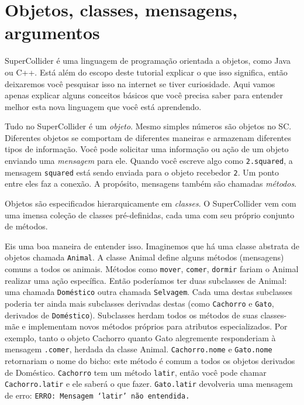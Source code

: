 \section{Objetos, classes, mensagens, argumentos}

SuperCollider é uma linguagem de programação orientada a objetos, como Java ou C++. Está além do escopo deste tutorial explicar o que isso significa, então deixaremos você pesquisar isso na internet se tiver curiosidade. Aqui vamos apenas explicar alguns conceitos básicos que você precisa saber para entender melhor esta nova linguagem que você está aprendendo.

Tudo no SuperCollider é um \emph{objeto}. Mesmo simples números são objetos no SC. Diferentes objetos se comportam de diferentes maneiras e armazenam diferentes tipos de informação. Você pode solicitar uma informação ou ação de um objeto enviando uma \emph{mensagem} para ele. Quando você escreve algo como \texttt{2.squared}, a mensagem \texttt{squared} está sendo enviada para o objeto recebedor \texttt{2}. Um ponto entre eles faz a conexão. A propósito, mensagens também são chamadas \emph{métodos}.

Objetos são especificados hierarquicamente em \emph{classes}. O SuperCollider vem com uma imensa coleção de classes pré-definidas, cada uma com seu próprio conjunto de métodos. 

Eis uma boa maneira de entender isso. Imaginemos que há uma classe abstrata de objetos chamada \texttt{Animal}. A classe Animal define alguns métodos (mensagens) comuns a todos os animais. Métodos como \texttt{mover}, \texttt{comer}, \texttt{dormir} fariam o Animal realizar uma ação específica. Então poderíamos ter duas subclasses de Animal: uma chamada \texttt{Doméstico} outra chamada \texttt{Selvagem}. Cada uma destas subclasses poderia ter ainda mais subclasses derivadas destas (como \texttt{Cachorro} e \texttt{Gato}, derivados de \texttt{Doméstico}). Subclasses herdam todos os métodos de suas classes-mãe e implementam novos métodos próprios para atributos especializados. Por exemplo, tanto o objeto Cachorro quanto Gato alegremente responderiam à mensagem \texttt{.comer}, herdada da classe Animal. \texttt{Cachorro.nome} e \texttt{Gato.nome} retornariam o nome do bicho: este método é comum a todos os objetos derivados de Doméstico. \texttt{Cachorro} tem um método \texttt{latir}, então você pode chamar \texttt{Cachorro.latir} e ele saberá o que fazer. \texttt{Gato.latir} devolveria uma mensagem de erro: \texttt{ERRO: Mensagem ‘latir’ não entendida.}

